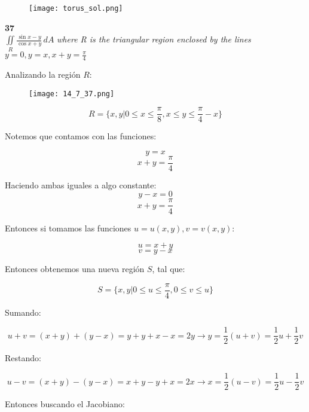 \documentclass[11pt]{report}
\begin{document}
\begin{figure}[h]
    \centering
    \texttt{[image: torus\_sol.png]}
\end{figure}


\newpage

\textbf{37} \\

$\iint \limits_{R} \frac{\sin{x - y}}{\cos{x + y}} \, dA$ \textit{where R is the
triangular region enclosed by the lines} \( y = 0, y = x, x + y = \frac{\pi}{4}\)

Analizando la región \(R\):

\begin{figure}[h]
    \centering
    \texttt{[image: 14\_7\_37.png]}
\end{figure}

\[
    R = \{ x, y | 0 \leq x \leq \frac{\pi}{8}, x \leq y \leq \frac{\pi}{4} - x \}
\]

Notemos que contamos con las funciones:

\[
    y = x
\]
\[
    x + y = \frac{\pi}{4}
\]

Haciendo ambas iguales a algo constante:
\[
    y - x = 0
\]
\[
    x + y = \frac{\pi}{4}
\]

Entonces si tomamos las funciones \( u = u(x, y), v = v(x, y) \):

\[
    u = x + y
\]
\[
    v = y - x
\]

Entonces obtenemos una nueva región \(S\), tal que:

\[
    S = \{x,y | 0 \leq u \leq \frac{\pi}{4}, 0 \leq v \leq u \}
\]

Sumando:

\[
    u + v = (x + y) + (y - x) = y + y + x - x = 2y \rightarrow y = \frac{1}{2}(u + v) = \frac{1}{2} u + \frac{1}{2} v
\]

Restando:

\[
    u - v = (x + y) - (y - x) = x + y - y + x = 2x \rightarrow x = \frac{1}{2}(u - v) = \frac{1}{2} u - \frac{1}{2} v
\]

Entonces buscando el Jacobiano:
\end{document}
